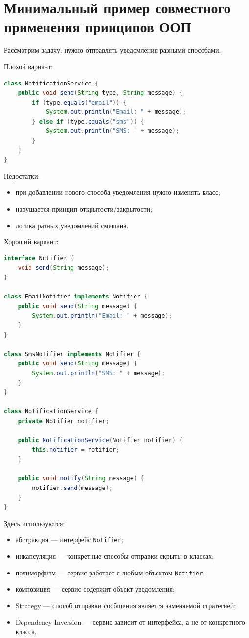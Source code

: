 \documentclass[12pt,a4paper]{article}
\begin{document}
\section{Минимальный пример совместного применения принципов ООП}

Рассмотрим задачу: нужно отправлять уведомления разными способами.

Плохой вариант:

\begin{lstlisting}[language=Java]
class NotificationService {
    public void send(String type, String message) {
        if (type.equals("email")) {
            System.out.println("Email: " + message);
        } else if (type.equals("sms")) {
            System.out.println("SMS: " + message);
        }
    }
}
\end{lstlisting}

Недостатки:
\begin{itemize}
    \item при добавлении нового способа уведомления нужно изменять класс;
    \item нарушается принцип открытости/закрытости;
    \item логика разных уведомлений смешана.
\end{itemize}

Хороший вариант:

\begin{lstlisting}[language=Java]
interface Notifier {
    void send(String message);
}

class EmailNotifier implements Notifier {
    public void send(String message) {
        System.out.println("Email: " + message);
    }
}

class SmsNotifier implements Notifier {
    public void send(String message) {
        System.out.println("SMS: " + message);
    }
}

class NotificationService {
    private Notifier notifier;

    public NotificationService(Notifier notifier) {
        this.notifier = notifier;
    }

    public void notify(String message) {
        notifier.send(message);
    }
}
\end{lstlisting}

Здесь используются:
\begin{itemize}
    \item абстракция --- интерфейс \texttt{Notifier};
    \item инкапсуляция --- конкретные способы отправки скрыты в классах;
    \item полиморфизм --- сервис работает с любым объектом \texttt{Notifier};
    \item композиция --- сервис содержит объект уведомления;
    \item Strategy --- способ отправки сообщения является заменяемой стратегией;
    \item Dependency Inversion --- сервис зависит от интерфейса, а не от конкретного класса.
\end{itemize}
\end{document}
